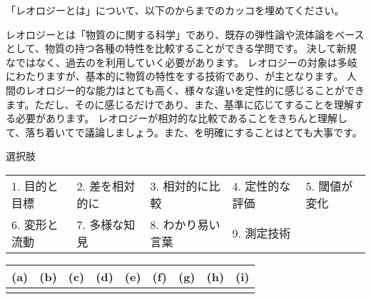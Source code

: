 \documentclass[uplatex,dvipdfmx,a4paper,11pt]{jsarticle}
\begin{document}
\begin{qparts}
    \qpart 「レオロジーとは」について、以下のからまでのカッコを埋めてください。
    \begin{qlist}
      \qitem レオロジーとは「物質の\qbox{}に関する科学」であり、既存の弾性論や流体論をベースとして、物質の持つ各種の特性を比較することができる学問です。
      決して新規な\qbox{}ではなく、過去の\qbox{}を利用していく必要があります。
      \qitem レオロジーの対象は多岐にわたりますが、基本的に物質の特性を\qbox{}する技術であり、\qbox{}が主となります。
      \qitem 人間のレオロジー的な能力はとても高く、様々な違いを定性的に感じることができます。ただし、その\qbox{}に感じるだけであり、また、基準に応じて\qbox{}することを理解する必要があります。
      \qitem レオロジーが相対的な比較であることをきちんと理解して、落ち着いて\qbox{}で議論しましょう。また、\qbox{}を明確にすることはとても大事です。
    \end{qlist}

    \begin{itembox}[l]{選択肢}
      \begin{center}
        \begin{tabular}{lllll}
                1. 目的と目標&2. 差を相対的に&3. 相対的に比較&4. 定性的な評価 & 5. 閾値が変化 \\
                6. 変形と流動&7. 多様な知見&8. わかり易い言葉 & 9. 測定技術
        \end{tabular}
      \end{center}
    \end{itembox}

    \begin{table}[htb]
      \begin{center} 
        \begin{tabular}{|p{}|p{}|p{}|p{}|p{}|p{}|p{}|p{}|p{}|} \hline
          (a) & (b) & (c) & (d) & (e) & (f) & (g) & (h) & (i)\\ \hline
            &  & & & & & & &  \\ \hline		
        \end{tabular}
      \end{center}
    \end{table}

\end{qparts}
\end{document}
